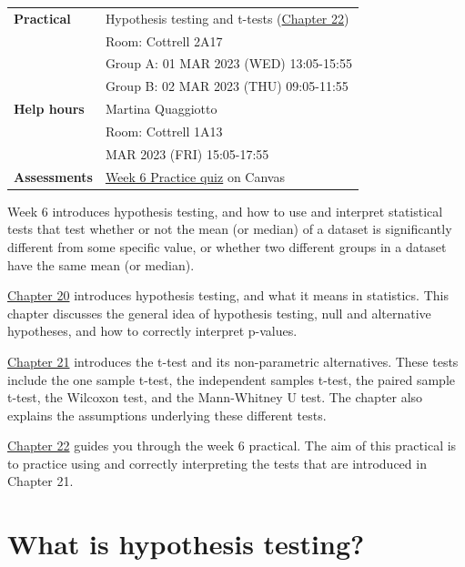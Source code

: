 \documentclass[
]{scrbook}
\begin{document}
\begin{longtable}[]{@{}
  >{\raggedright\arraybackslash}p{}
  >{\raggedright\arraybackslash}p{}@{}}
\textbf{Practical} & Hypothesis testing and t-tests (\protect\hyperlink{Chapter_22}{Chapter 22}) \\
& Room: Cottrell 2A17 \\
& Group A: 01 MAR 2023 (WED) 13:05-15:55 \\
& Group B: 02 MAR 2023 (THU) 09:05-11:55 \\
\textbf{Help hours} & Martina Quaggiotto \\
& Room: Cottrell 1A13 \\
& 03 MAR 2023 (FRI) 15:05-17:55 \\
\textbf{Assessments} & \href{https://canvas.stir.ac.uk/courses/13075/quizzes/30519}{Week 6 Practice quiz} on Canvas \\
\bottomrule
\end{longtable}

Week 6 introduces hypothesis testing, and how to use and interpret statistical tests that test whether or not the mean (or median) of a dataset is significantly different from some specific value, or whether two different groups in a dataset have the same mean (or median).

\protect\hyperlink{Chapter_20}{Chapter 20} introduces hypothesis testing, and what it means in statistics. This chapter discusses the general idea of hypothesis testing, null and alternative hypotheses, and how to correctly interpret p-values.

\protect\hyperlink{Chapter_21}{Chapter 21} introduces the t-test and its non-parametric alternatives. These tests include the one sample t-test, the independent samples t-test, the paired sample t-test, the Wilcoxon test, and the Mann-Whitney U test. The chapter also explains the assumptions underlying these different tests.

\protect\hyperlink{Chapter_22}{Chapter 22} guides you through the week 6 practical. The aim of this practical is to practice using and correctly interpreting the tests that are introduced in Chapter 21.

\hypertarget{Chapter_20}{%
\chapter{What is hypothesis testing?}\label{Chapter_20}}
\end{document}
